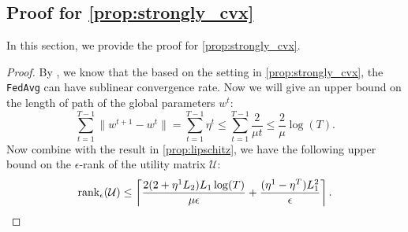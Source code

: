 \subsection{Proof for \autoref{prop:strongly_cvx}}
In this section, we provide the proof for \autoref{prop:strongly_cvx}. 
\begin{proof}
 By \citep[Theorem~1]{li2019convergence}, we know that the based on the setting in \autoref{prop:strongly_cvx}, the \texttt{FedAvg} can have sublinear convergence rate. Now we will give an upper bound on the length of path of the global parameters $w^t$: 
 \[\sum_{t=1}^{T-1} \|w^{t+1} - w^t\| = \sum_{t=1}^{T-1} \eta^t \leq \sum_{t=1}^{T-1} \frac{2}{\mu t} \leq \frac{2}{\mu} \log(T).\]
 Now combine with the result in \autoref{prop:lipschitz}, we have the following upper bound on the $\epsilon$-rank of the utility matrix $\mathcal{U}$:
 \[\operatorname{rank}_{\epsilon}(\mathcal{U}) \leq \left\lceil \frac{2(2+\eta^1L_2) L_1 \log(T)}{\mu\epsilon} +  \frac{(\eta^1 - \eta^T)L_1^2}{\epsilon} \right\rceil.\]
\end{proof}

